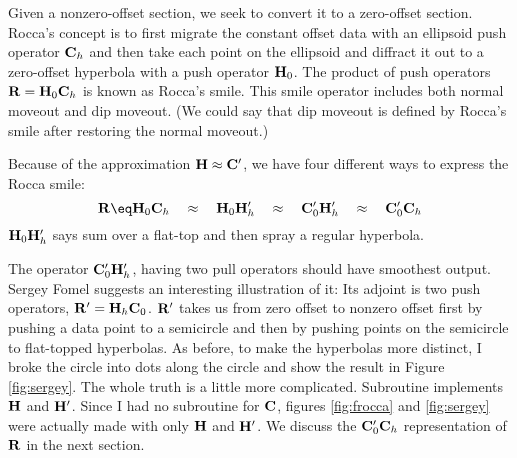 \par
Given a nonzero-offset section,
we seek to convert it to a zero-offset section.
Rocca's concept is to first migrate the constant offset data
with an ellipsoid push operator $\bold C_h$
and then take each point on the ellipsoid
and diffract it out to a zero-offset hyperbola
with a push operator $\bold H_0$.
The product of push operators
$\bold R = \bold H_0 \bold C_h$
is known as Rocca's smile.
This smile operator includes both normal moveout and dip moveout.
(We could say that dip moveout is defined by Rocca's smile
after restoring the normal moveout.)

\par
Because of the approximation $\bold H \approx \bold C'$,
we have four different ways to express the Rocca smile:
\begin{equation}
\bold R \eq
		 \bold H_0 \bold C_h
\quad\approx\quad
		 \bold H_0 \bold H'_h
\quad\approx\quad
		 \bold C'_0 \bold H'_h
\quad\approx\quad
		 \bold C'_0 \bold C_h
\label{eqn:fourR}
\end{equation}
$\bold H_0 \bold H'_h$ says sum over a flat-top and then spray
a regular hyperbola.
\par
The operator $\bold C'_0 \bold H'_h$,
having two pull operators should have smoothest output.
Sergey Fomel suggests an interesting illustration of it:
Its adjoint is two push operators,
$ \bold R' = \bold H_h \bold C_0$.
$ \bold R'$ takes us from zero offset to nonzero offset
first by pushing a data point to a semicircle
and then by pushing points on the semicircle to flat-topped hyperbolas.
As before, to make the hyperbolas more distinct,
I broke the circle into dots along the circle
and show the result in Figure \ref{fig:sergey}.
The whole truth is a little more complicated.
Subroutine %
implements $\bold H$ and $\bold H'$.
Since I had no subroutine for $\bold C$,
figures \ref{fig:frocca} and \ref{fig:sergey}
were actually made with only $\bold H$ and $\bold H'$.
We discuss the
$\bold C'_0 \bold C_h$
representation of $\bold R$ in the next section.

